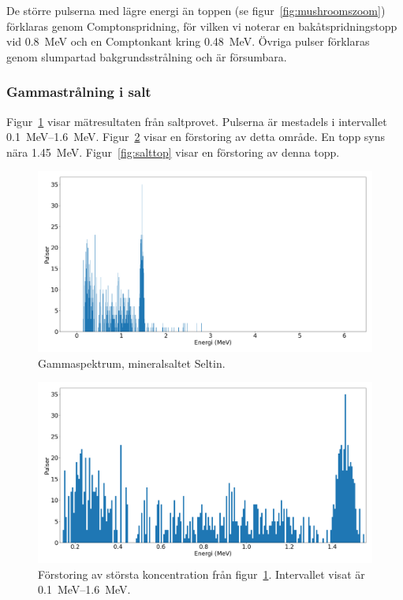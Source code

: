 De större pulserna med lägre energi än toppen (se
figur~\ref{fig:mushroomszoom}) förklaras genom Comptonspridning, för vilken
vi noterar en bakåtspridningstopp vid \qty{0.8}{\MeV} och en Comptonkant kring
\qty{0.48}{\MeV}. Övriga pulser förklaras genom slumpartad bakgrundsstrålning
och är försumbara.

\subsubsection{Gammastrålning i salt}

Figur~\ref{fig:salt} visar mätresultaten från saltprovet. Pulserna är
mestadels i intervallet \qtyrange{0.1}{1.6}{\MeV}. Figur~\ref{fig:saltzoom}
visar en förstoring av detta område. En topp syns nära \qty{1.45}{\MeV}.
Figur~\ref{fig:salttop} visar en förstoring av denna topp.

\begin{figure}[!ht]
    \centering
    \includegraphics[width=\textwidth, keepaspectratio]{../images/salt.png}
    \caption{Gammaspektrum, mineralsaltet Seltin.}
    \label{fig:salt}
\end{figure}

\begin{figure}[!ht]
    \centering
    \includegraphics[width=\textwidth, keepaspectratio]{../images/salt_zoom.png}
    \caption{
        Förstoring av största koncentration från figur~\ref{fig:salt}.
        Intervallet visat är \qtyrange{0.1}{1.6}{\MeV}.
    }
    \label{fig:saltzoom}
\end{figure}

